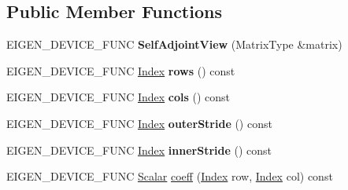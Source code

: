 \subsection*{Public Member Functions}
\begin{DoxyCompactItemize}
\item 
\mbox{\label{class_eigen_1_1_self_adjoint_view_a48f8d3daf5c2e24fefa670accdbddb40}} 
E\+I\+G\+E\+N\+\_\+\+D\+E\+V\+I\+C\+E\+\_\+\+F\+U\+NC {\bfseries Self\+Adjoint\+View} (Matrix\+Type \&matrix)
\item 
\mbox{\label{class_eigen_1_1_self_adjoint_view_a51495c1de8eaa0b6ffd20a507d0dc961}} 
E\+I\+G\+E\+N\+\_\+\+D\+E\+V\+I\+C\+E\+\_\+\+F\+U\+NC \mbox{\hyperlink{struct_eigen_1_1_eigen_base_a554f30542cc2316add4b1ea0a492ff02}{Index}} {\bfseries rows} () const
\item 
\mbox{\label{class_eigen_1_1_self_adjoint_view_a500b2a5fe1b0ea6e9da750b83bbe78e4}} 
E\+I\+G\+E\+N\+\_\+\+D\+E\+V\+I\+C\+E\+\_\+\+F\+U\+NC \mbox{\hyperlink{struct_eigen_1_1_eigen_base_a554f30542cc2316add4b1ea0a492ff02}{Index}} {\bfseries cols} () const
\item 
\mbox{\label{class_eigen_1_1_self_adjoint_view_a3e525f82da8beeed15359a7f64fefedf}} 
E\+I\+G\+E\+N\+\_\+\+D\+E\+V\+I\+C\+E\+\_\+\+F\+U\+NC \mbox{\hyperlink{struct_eigen_1_1_eigen_base_a554f30542cc2316add4b1ea0a492ff02}{Index}} {\bfseries outer\+Stride} () const
\item 
\mbox{\label{class_eigen_1_1_self_adjoint_view_a6b14f347cf3b1d5f2e2d00934c2af9c2}} 
E\+I\+G\+E\+N\+\_\+\+D\+E\+V\+I\+C\+E\+\_\+\+F\+U\+NC \mbox{\hyperlink{struct_eigen_1_1_eigen_base_a554f30542cc2316add4b1ea0a492ff02}{Index}} {\bfseries inner\+Stride} () const
\item 
E\+I\+G\+E\+N\+\_\+\+D\+E\+V\+I\+C\+E\+\_\+\+F\+U\+NC \mbox{\hyperlink{class_eigen_1_1_self_adjoint_view_af52acc0942ece2de9b6db4a99cc6656e}{Scalar}} \mbox{\hyperlink{class_eigen_1_1_self_adjoint_view_ad49cb2f908a2069cbacf9836b9bd6b84}{coeff}} (\mbox{\hyperlink{struct_eigen_1_1_eigen_base_a554f30542cc2316add4b1ea0a492ff02}{Index}} row, \mbox{\hyperlink{struct_eigen_1_1_eigen_base_a554f30542cc2316add4b1ea0a492ff02}{Index}} col) const

\end{DoxyCompactItemize}
